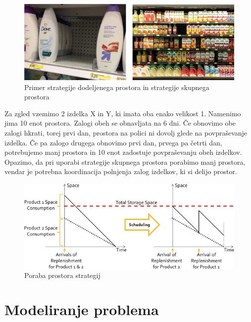 \documentclass[a4paper]{article}
\begin{document}
\begin{figure}[h]
\includegraphics [scale = 0.8]{zgled-strategij}
\caption{Primer strategije dodeljenega prostora in strategije skupnega prostora}
\centering
\end{figure}

Za zgled vzemimo 2 izdelka X in Y, ki imata oba enako velikost 1. Namenimo jima 10 enot prostora. Zalogi obeh se obnavljata na 6 dni. Če obnovimo obe zalogi hkrati, torej prvi dan, prostora na polici ni dovolj glede na povpraševanje izdelka. Če pa zalogo drugega obnovimo prvi dan, prvega pa četrti dan, potrebujemo manj prostora in 10 enot zadostuje povpraševanju obeh izdelkov. Opazimo, da pri uporabi strategije skupnega prostora porabimo manj prostora, vendar je potrebna koordinacija polnjenja zalog izdelkov, ki si delijo prostor.

\begin{figure}[ht]
\includegraphics [scale = 0.8]{primerjava-strategij}
\caption{Poraba prostora strategij}
\end{figure}



\section{Modeliranje problema}
\end{document}
